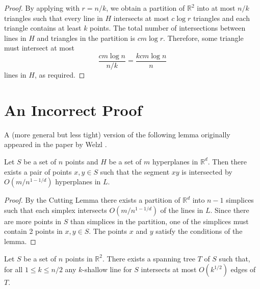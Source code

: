 \documentclass[lotsofwhite]{patmorin}
\begin{document}
\begin{proof}
By applying  with $r=n/k$, we obtain a partition of
$\mathbb{R}^2$ into at most $n/k$ triangles such that every line in
$H$ intersects at most $c\log r$ triangles and each triangle contains
at least $k$ points.  The total number of intersections between lines in
$H$ and triangles in the partition is $cm\log r$.  Therefore, some
triangle must intersect at most
\[
    \frac{cm\log n}{n/k} = \frac{kcm\log n}{n} 
\]
lines in $H$, as required.
\end{proof}


\section{An Incorrect Proof}

A (more general but less tight) version of the following lemma
originally appeared in the paper by Welzl \cite[Lemma~4.1]{welzl}.

\begin{lem}
Let $S$ be a set of $n$ points and $H$ be a set of $m$ hyperplanes
in $\mathbb{R}^d$. Then there exists a pair of points $x,y\in S$ such
that the segment $xy$ is intersected by $O(m/n^{1-1/d})$
hyperplanes in $L$.
\end{lem}

\begin{proof}
By the Cutting Lemma \cite[Lemma~X.X]{matousek-cutting-lemma} there
exists a partition of $\mathbb{R}^d$ into $n-1$ simplices such that
each simplex intersects $O(m/n^{1-1/d})$ of the lines in $L$.  Since
there are more points in $S$ than simplices in the partition, one of
the simplices must contain 2 points in $x,y\in S$.  The points $x$ and
$y$ satisfy the conditions of the lemma.
\end{proof}


\begin{thm}
Let $S$ be a set of $n$ points in $\mathbb{R}^2$.  There exists a
spanning tree $T$ of $S$ such that, for all $1\le k\le n/2$ any
$k$-shallow line for $S$ intersects at most $O(k^{1/2})$ edges of $T$.
\end{thm}
\end{document}
